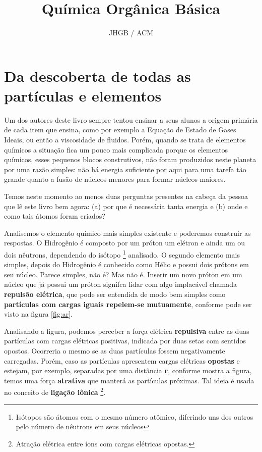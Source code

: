 \documentclass[a4paper,12pt,]{book}
\begin{document}
	\author{JHGB / ACM}
	\title{Química Orgânica Básica}
	\dominitoc
	\frontmatter
	\maketitle
	\tableofcontents
	\listoffigures
	\listoftables
	
	\mainmatter
	
	\chapter{Da descoberta de todas as partículas e elementos}
	\begin{mdframed}[backgroundcolor=orange!20,linewidth=0pt,roundcorner=10pt]
		\minitoc
	\end{mdframed}
	\hspace{\parindent} Um dos autores deste livro sempre tentou ensinar a seus alunos a origem primária de cada item que ensina, como por exemplo a Equação de Estado de Gases Ideais, ou então a viscosidade de fluidos. Porém, quando se trata de elementos químicos a situação fica um pouco mais complicada porque os elementos químicos, esses pequenos blocos construtivos, não foram produzidos neste planeta por uma razão simples: não há energia suficiente por aqui para uma tarefa tão grande quanto a fusão de núcleos menores para formar núcleos maiores.

	Temos neste momento ao menos duas perguntas presentes na cabeça da pessoa que lê este livro bem agora: (a) por que é necessária tanta energia e (b) onde e como tais átomos foram criados?

	Analisemos o elemento químico mais simples existente e poderemos construir as respostas. O Hidrogênio é composto por um próton um elétron e ainda um ou dois nêutrons, dependendo do isótopo \footnote{Isótopos são átomos com o mesmo número atômico, diferindo uns dos outros pelo número de nêutrons em seus núcleos} analisado. O segundo elemento mais simples, depois do Hidrogênio é conhecido como Hélio e possui dois prótons em seu núcleo. Parece simples, não é? Mas não é. Inserir um novo próton em um núcleo que já possui um próton signifca lidar com algo implacável chamada \textbf{repulsão elétrica}, que pode ser entendida de modo bem simples como \textbf{partículas com cargas iguais repelem-se mutuamente}, conforme pode ser visto na figura \ref{fig:ar}.

	Analisando a figura, podemos perceber a força elétrica \textbf{repulsiva} entre as duas partículas com cargas elétricas positivas, indicada por duas setas com sentidos opostos. Ocorreria o mesmo se as duas partículas fossem negativamente carregadas. Porém, caso as partículas apresentem cargas elétricas \textbf{opostas} e estejam, por exemplo, separadas por uma distância \textbf{r}, conforme mostra a figura, temos uma força \textbf{atrativa} que manterá as partículas próximas. Tal ideia é usada no conceito de \textbf{ligação iônica} \footnote{Atração elétrica entre íons com cargas elétricas opostas.}.
\end{document}
